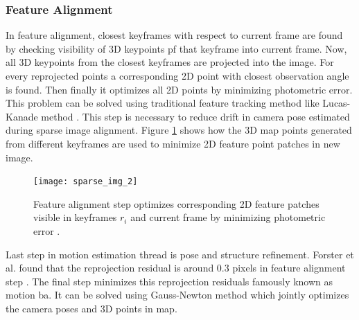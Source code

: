 \subsubsection{Feature Alignment}
In feature alignment, closest keyframes with respect to current frame are found by checking visibility of 3D keypoints pf that keyframe into current frame. Now, all 3D keypoints from the closest keyframes are projected into the image. For every reprojected points a corresponding 2D point with closest observation angle is found. Then finally it optimizes all 2D points by minimizing photometric error. This problem can be solved using traditional feature tracking method like Lucas-Kanade method \cite{Lucas81}. This step is necessary to reduce drift in camera pose estimated during sparse image alignment. Figure \ref{fig:sparse_img_2}  shows how the 3D map points generated from different keyframes are used to minimize 2D feature point patches in new image.\\
\begin{figure}[H]
	\centering
	\texttt{[image: sparse\_img\_2]}
	\caption{Feature alignment step optimizes corresponding 2D feature patches visible in keyframes $ r_{i} $ and current frame by minimizing photometric error \cite{Forster2014ICRA}.}
	\label{fig:sparse_img_2}
\end{figure}
\noindent Last step in motion estimation thread is pose and structure refinement. Forster et al. found that the reprojection residual is around 0.3 pixels in feature alignment step \cite{Forster2014ICRA}. The final step minimizes this reprojection residuals famously known as motion \acrshort{ba}. It can be solved using Gauss-Newton method which jointly optimizes the camera poses and 3D points in map. \\

